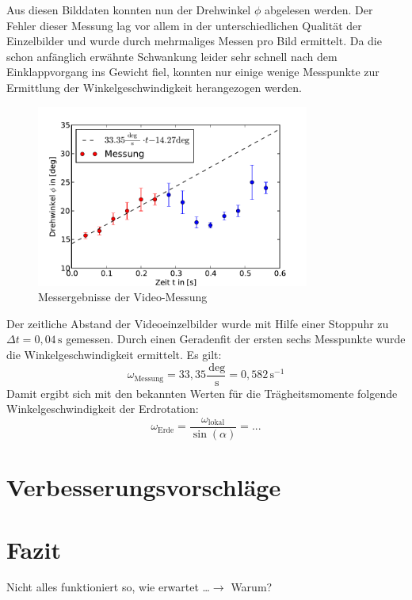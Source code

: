 \documentclass[11pt]{scrartcl}
\newcommand{\unit}[1]{\ensuremath{\,\mathrm{#1}}} %
\begin{document}
Aus diesen Bilddaten konnten nun der Drehwinkel $\phi$ abgelesen werden. Der Fehler dieser Messung lag vor allem in der unterschiedlichen Qualität der Einzelbilder und wurde durch mehrmaliges Messen pro Bild ermittelt.
Da die schon anfänglich erwähnte Schwankung leider sehr schnell nach dem Einklappvorgang ins Gewicht fiel, konnten nur einige wenige Messpunkte zur Ermittlung der Winkelgeschwindigkeit herangezogen werden.
\begin{figure}[h]
\begin{center}
\includegraphics[width=0.8\textwidth]{images/messung_Video.pdf}
\end{center}
\vspace{-1.5\baselineskip}
\caption{Messergebnisse der Video-Messung}
\label{messung_Video}
\end{figure}
Der zeitliche Abstand der Videoeinzelbilder wurde mit Hilfe einer Stoppuhr zu $\Delta t = 0,04\unit{s}$ gemessen.
Durch einen Geradenfit der ersten sechs Messpunkte wurde die Winkelgeschwindigkeit ermittelt. Es gilt:
\[ \omega_{\text{Messung}} = 33,35 \frac{\unit{deg}}{\unit{s}} = 0,582 \unit{s^{-1}} \]
Damit ergibt sich mit den bekannten Werten für die Trägheitsmomente folgende Winkelgeschwindigkeit der Erdrotation:
\[ \omega_{\text{Erde}} = \frac{\omega_{\text{lokal}}}{\sin(\alpha)} = ... \]


\section{Verbesserungsvorschläge} %


\section{Fazit} %
Nicht alles funktioniert so, wie erwartet \dots $\rightarrow$ Warum?
\end{document}
